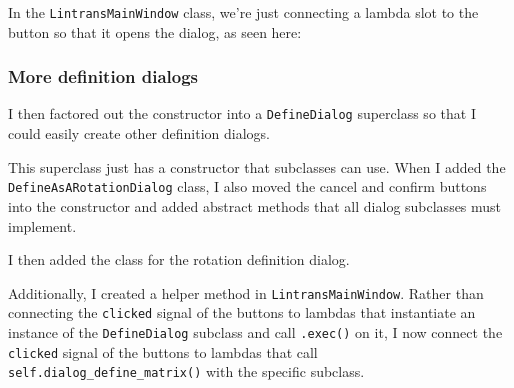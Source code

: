 \documentclass[../main.tex]{subfiles}
\begin{document}
In the \texttt{LintransMainWindow} class, we're just connecting a lambda slot to the button so that it opens the dialog, as seen here:


\subsubsection{More definition dialogs\label{development:initial-gui:more-definition-dialogs}}

I then factored out the constructor into a \texttt{DefineDialog} superclass so that I could easily create other definition dialogs.


This superclass just has a constructor that subclasses can use. When I added the \texttt{DefineAsARotationDialog} class, I also moved the cancel and confirm buttons into the constructor and added abstract methods that all dialog subclasses must implement.


I then added the class for the rotation definition dialog.



Additionally, I created a helper method in \texttt{LintransMainWindow}. Rather than connecting the \texttt{clicked} signal of the buttons to lambdas that instantiate an instance of the \texttt{DefineDialog} subclass and call \texttt{.exec()} on it, I now connect the \texttt{clicked} signal of the buttons to lambdas that call \texttt{self.dialog\_define\_matrix()} with the specific subclass.
\end{document}
